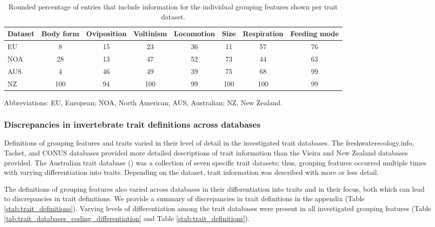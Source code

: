 \documentclass{article}
\begin{document}
\begin{table}[ht]
    \centering
    \caption{Rounded percentage of entries that include 
    information for the individual grouping features
    shown per trait dataset.} 
    \label{tab:trait_coverage}
    \begin{tabular}{lccccccc}
    \toprule[.1em]
    Dataset & Body form & Oviposition & Voltinism & Locomotion & Size & Respiration & Feeding mode \\ 
    \toprule[.1em]
    EU & 8 & 15 & 23 & 36 & 11 & 57 & 76 \\ 
    NOA & 28 & 13 & 47 & 52 & 73 & 44 & 63 \\ 
    AUS & 4 & 46 & 49 & 39 & 75 & 68 & 99 \\ 
    NZ & 100 & 94 & 100 & 99 & 100 & 100 & 99 \\ 
    \bottomrule
    \end{tabular}
\end{table}
\begin{minipage}{\linewidth}{\fontsize{8}{10}\selectfont
\centering
Abbreviations: EU, European; NOA, North American; AUS, Australian; NZ, New Zealand.
}
\end{minipage}

\newpage


\subsubsection*{Discrepancies in invertebrate trait definitions across databases}

Definitions of grouping features and traits varied in their level of detail in the investigated trait databases. The freshwaterecology.info, Tachet, and CONUS databases provided more detailed descriptions of trait information than the Vieira and New Zealand databases provided. The Australian trait database (\cite{kefford_integrated_2020}) was a collection of seven specific trait datasets; thus, grouping features occurred multiple times with varying differentiation into traits. Depending on the dataset, trait information was described with more or less detail.

The definitions of grouping features also varied across databases in their differentiation into traits and in their focus, both which can lead to discrepancies in trait definitions. We provide a summary of discrepancies in trait definitions in the appendix (Table \ref{stab:trait_definitions}). Varying levels of differentiation among the trait databases were present in all investigated grouping features (Table \ref{tab:trait_databases_coding_differentiation} and Table \ref{stab:trait_definitions}).
\end{document}

